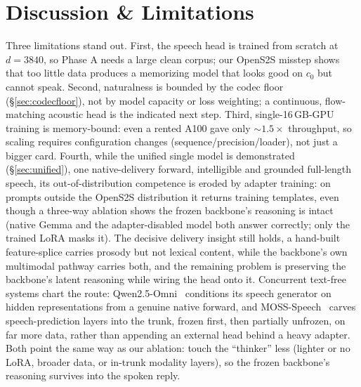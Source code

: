 \documentclass[11pt]{article}
\begin{document}
\section{Discussion \& Limitations}
\label{sec:discussion}
Three limitations stand out. First, the speech head is trained from scratch at
$d{=}3840$, so Phase A needs a large clean corpus; our OpenS2S misstep shows that
too little data produces a memorizing model that looks good on $c_0$ but cannot
speak. Second, naturalness is bounded by the codec floor (\S\ref{sec:codecfloor}),
not by model capacity or loss weighting; a continuous, flow-matching acoustic head
is the indicated next step. Third, single-16\,GB-GPU training is memory-bound: even
a rented A100 gave only ${\sim}1.5\times$ throughput, so scaling requires
configuration changes (sequence/precision/loader), not just a bigger card.
Fourth, while the unified single model is demonstrated (\S\ref{sec:unified}), one
native-delivery forward, intelligible and grounded full-length speech, its
out-of-distribution competence is eroded by adapter training: on prompts outside the
OpenS2S distribution it returns training templates, even though a three-way ablation
shows the frozen backbone's reasoning is intact (native Gemma and the adapter-disabled
model both answer correctly; only the trained LoRA masks it). The decisive delivery
insight still holds, a hand-built feature-splice carries prosody but not lexical
content, while the backbone's own multimodal pathway carries both, and the remaining
problem is preserving the backbone's latent reasoning while wiring the head onto it.
Concurrent text-free systems chart the route: Qwen2.5-Omni~\citep{xu2025qwen25omni}
conditions its speech generator on hidden representations from a genuine native
forward, and MOSS-Speech~\citep{zhao2025mossspeech} carves speech-prediction layers
into the trunk, frozen first, then partially unfrozen, on far more data, rather than
appending an external head behind a heavy adapter. Both point the same way as our
ablation: touch the ``thinker'' less (lighter or no LoRA, broader data, or in-trunk
modality layers), so the frozen backbone's reasoning survives into the spoken reply.
\end{document}
